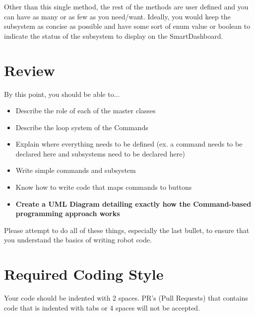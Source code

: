 \documentclass[11pt,fleqn]{article}
\begin{document}
Other than this single method, the rest of the methods are user defined and you can have as many or
as few as you need/want. Ideally, you would keep the subsystem as concise as possible and have some
sort of enum value or boolean to indicate the status of the subsystem to display on the
SmartDashboard.

\section{Review}
By this point, you should be able to...
\begin{itemize}
\item
Describe the role of each of the master classes
\item
Describe the loop system of the Commands
\item
Explain where everything needs to be defined (ex. a command needs to be declared here and
subsystems need to be declared here)
\item
Write simple commands and subsystem
\item
Know how to write code that maps commands to buttons
\item
\textbf{Create a UML Diagram detailing exactly how the Command-based programming approach works}
\end{itemize}

Please attempt to do all of these things, especially the last bullet, to ensure that you understand
the basics of writing robot code.

\section{Required Coding Style}
Your code should be indented with 2 spaces. PR's (Pull Requests) that contains code that is indented with tabs or 4 spaces will not be accepted.
\end{document}
